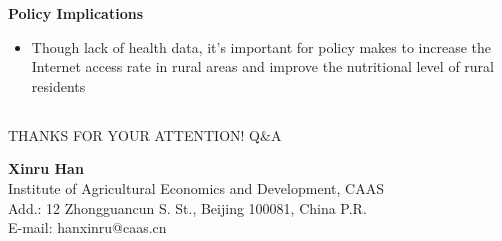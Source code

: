 \documentclass{beamer}	%
\theoremstyle{plain}
\theoremstyle{definition}
\theoremstyle{remark}
\numberwithin{equation}{section}
\begin{document}
\begin{frame}
	\textbf{Policy Implications} \\
	\begin{itemize}
	\item Though lack of health data, it's important for policy makes to increase the Internet access rate in rural areas and improve the nutritional level of rural residents
	\end{itemize}
\end{frame}

\subsection {}
\begin{frame}
	\begin{block}{THANKS FOR YOUR ATTENTION!}
	Q\&A
	\end{block}
	\textbf{Xinru Han} \\
	Institute of Agricultural Economics and Development, CAAS \\
	Add.: 12 Zhongguancun S. St., Beijing 100081, China P.R. \\
	E-mail: hanxinru@caas.cn \\
\end{frame}
\end{document}
